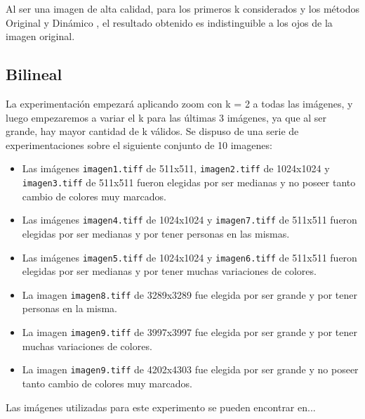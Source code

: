 \documentclass[a4paper]{article}
\newcounter{col}
\begin{document}
Al ser una imagen de alta calidad, para los primeros k considerados y los métodos Original y Dinámico , el resultado obtenido es indistinguible a los ojos de la imagen original.



\subsection{Bilineal}
La experimentaci\'on empezar\'a aplicando zoom con k = 2 a todas las im\'agenes, y luego empezaremos a variar el k para las \'ultimas 3 im\'agenes, ya que al ser grande, hay mayor cantidad de k v\'alidos.
Se dispuso de una serie de experimentaciones sobre el siguiente conjunto de 10 imagenes:\\
\begin{itemize}
	\item Las im\'agenes \texttt{imagen1.tiff} de 511x511, \texttt{imagen2.tiff} de 1024x1024 y \texttt{imagen3.tiff} de 511x511 fueron elegidas por ser medianas y no poseer tanto cambio de colores muy marcados.
	\item Las im\'agenes \texttt{imagen4.tiff} de 1024x1024 y \texttt{imagen7.tiff} de 511x511 fueron elegidas por ser medianas y por tener personas en las mismas.
	\item Las im\'agenes \texttt{imagen5.tiff} de 1024x1024 y \texttt{imagen6.tiff} de 511x511 fueron elegidas por ser medianas y por tener muchas variaciones de colores.
	\item La imagen \texttt{imagen8.tiff} de 3289x3289 fue elegida por ser grande y por tener personas en la misma.
	\item La imagen \texttt{imagen9.tiff} de 3997x3997 fue elegida por ser grande y por tener muchas variaciones de colores.
	\item La imagen \texttt{imagen9.tiff} de 4202x4303 fue elegida por ser grande y no poseer tanto cambio de colores muy marcados.
\end{itemize}
Las im\'agenes utilizadas para este experimento se pueden encontrar en...\\
\end{document}
